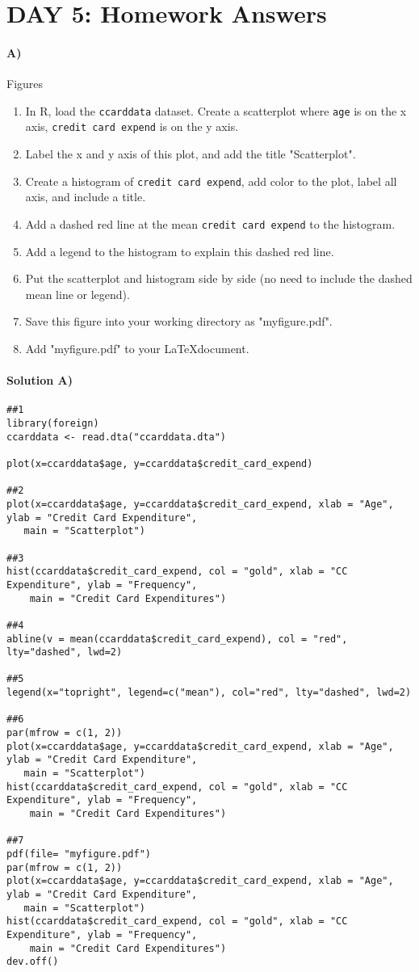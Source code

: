\documentclass[10pt]{article}
\begin{document}
\section*{DAY 5: Homework Answers}

\paragraph{A)} Figures
\begin{enumerate}
\item In R, load the \texttt{ccarddata} dataset. Create a scatterplot where \texttt{age} is on the x axis, \texttt{credit card expend} is on the y axis.
\item Label the x and y axis of this plot, and add the title "Scatterplot".
\item Create a histogram of \texttt{credit card expend}, add color to the plot, label all axis, and include a title.
\item Add a dashed red line at the mean \texttt{credit card expend} to the histogram.
\item Add a legend to the histogram to explain this dashed red line.
\item Put the scatterplot and histogram side by side (no need to include the dashed mean line or legend).
\item Save this figure into your working directory as "myfigure.pdf".
\item Add "myfigure.pdf" to your \LaTeX  document.
\end{enumerate}

\paragraph{Solution A)}
\begin{verbatim}
##1
library(foreign)
ccarddata <- read.dta("ccarddata.dta")

plot(x=ccarddata$age, y=ccarddata$credit_card_expend)

##2
plot(x=ccarddata$age, y=ccarddata$credit_card_expend, xlab = "Age", ylab = "Credit Card Expenditure",
   main = "Scatterplot")

##3
hist(ccarddata$credit_card_expend, col = "gold", xlab = "CC Expenditure", ylab = "Frequency", 
	main = "Credit Card Expenditures")

##4
abline(v = mean(ccarddata$credit_card_expend), col = "red", lty="dashed", lwd=2)

##5
legend(x="topright", legend=c("mean"), col="red", lty="dashed", lwd=2)

##6
par(mfrow = c(1, 2))
plot(x=ccarddata$age, y=ccarddata$credit_card_expend, xlab = "Age", ylab = "Credit Card Expenditure",
   main = "Scatterplot")
hist(ccarddata$credit_card_expend, col = "gold", xlab = "CC Expenditure", ylab = "Frequency", 
	main = "Credit Card Expenditures")

##7
pdf(file= "myfigure.pdf")
par(mfrow = c(1, 2))
plot(x=ccarddata$age, y=ccarddata$credit_card_expend, xlab = "Age", ylab = "Credit Card Expenditure",
   main = "Scatterplot")
hist(ccarddata$credit_card_expend, col = "gold", xlab = "CC Expenditure", ylab = "Frequency", 
	main = "Credit Card Expenditures")
dev.off()
\end{verbatim}
\end{document}
